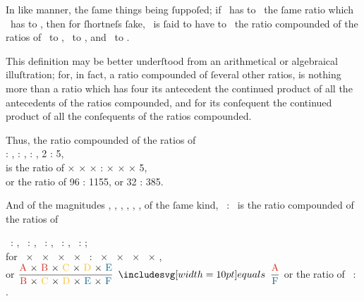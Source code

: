 \documentclass[12pt,preview]{standalone}
\begin{document}
\begin{minipage}{\textwidth}
    \hfill

    In like manner, the ſame things being ſuppoſed; if \yellowM\ has to \yellowN\ the ſame ratio which \redA\ has to \redD, then for ſhortneſs ſake, \yellowM\ is ſaid to have to \yellowN\ the ratio compounded of the ratios of \blueE\ to \blueF, \blueG\ to \blueH, and \blueK\ to \blueL.

    \hfill

    This definition may be better underſtood from an arithmetical or algebraical illuſtration; for, in fact, a ratio compounded of ſeveral other ratios, is nothing more than a ratio which has four its antecedent the continued product of all the antecedents of the ratios compounded, and for its conſequent the continued product of all the conſequents of the ratios compounded.
\end{minipage}

\newpage

\begin{minipage}{\textwidth}


    \begin{center}
        Thus, the ratio compounded of the ratios of\\
        {\color{cred}{2}} : {\color{cred}{3}}, {\color{cyellow}{4}} : {\color{cyellow}{7}}, {\color{cblue}{6}} : {\color{cblue}{11}}, 2 : 5,\\
        is the ratio of {\color{cred}{2}} × {\color{cyellow}{4}} × {\color{cblue}{6}} × {\color{cred}{2}} : {\color{cred}{3}} × {\color{cyellow}{7}} × {\color{cblue}{11}} × 5,\\
        or the ratio of 96 : 1155, or 32 : 385.
    \end{center}

    \hfill

    And of the magnitudes \redA, \redB, \yellowC, \yellowD, \blueE, \blueF, of the ſame kind, \redA\ : \blueF\ is the ratio compounded of the ratios of

    \hfill

    \begin{center}
        \redA\ : \redB, \redB\ : \yellowC, \yellowC\ : \yellowD, \yellowD\ : \blueE, \blueE\ : \blueF;\\
        for \redA\ × \redB\ × \yellowC\ × \yellowD\ × \blueE\ : \redB\ × \yellowC\ × \yellowD\ × \blueE\ × \blueF,\\
        or $\dfrac{\text{\redA\ × \redB\ × \yellowC\ × \yellowD\ × \blueE}}{\text{\redB\ × \yellowC\ × \yellowD\ × \blueE\ × \blueF}} \bequals \dfrac{\text{\redA}}{\text{\blueF}}$ or the ratio of \redA\ : \blueF.
    \end{center}

    \hfill

\end{minipage}
\end{document}
